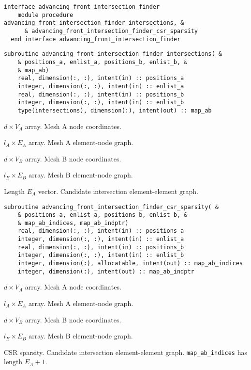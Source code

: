 \documentclass{article}
\begin{document}
\begin{lstlisting}[language=FORTRAN]
  interface advancing_front_intersection_finder
    module procedure advancing_front_intersection_finder_intersections, &
      & advancing_front_intersection_finder_csr_sparsity
  end interface advancing_front_intersection_finder
\end{lstlisting}

\begin{lstlisting}[language=FORTRAN]
  subroutine advancing_front_intersection_finder_intersections( &
    & positions_a, enlist_a, positions_b, enlist_b, &
    & map_ab)
    real, dimension(:, :), intent(in) :: positions_a
    integer, dimension(:, :), intent(in) :: enlist_a
    real, dimension(:, :), intent(in) :: positions_b
    integer, dimension(:, :), intent(in) :: enlist_b
    type(intersections), dimension(:), intent(out) :: map_ab
\end{lstlisting}

\begin{description}[font=\ttfamily\bfseries,leftmargin=2.2\parindent,labelindent=1.7\parindent,noitemsep]
  \item[positions\_a] $d \times V_A$ array. Mesh A node coordinates.
  \item[enlist\_a] $l_A \times E_A$ array. Mesh A element-node graph.
  \item[positions\_b] $d \times V_B$ array. Mesh B node coordinates.
  \item[enlist\_b] $l_B \times E_B$ array. Mesh B element-node graph.
  \item[map\_ab] Length $E_A$ vector. Candidate intersection element-element
    graph.
\end{description}

\begin{lstlisting}[language=FORTRAN]
  subroutine advancing_front_intersection_finder_csr_sparsity( &
    & positions_a, enlist_a, positions_b, enlist_b, &
    & map_ab_indices, map_ab_indptr)
    real, dimension(:, :), intent(in) :: positions_a
    integer, dimension(:, :), intent(in) :: enlist_a
    real, dimension(:, :), intent(in) :: positions_b
    integer, dimension(:, :), intent(in) :: enlist_b
    integer, dimension(:), allocatable, intent(out) :: map_ab_indices
    integer, dimension(:), intent(out) :: map_ab_indptr
\end{lstlisting}

\begin{description}[font=\ttfamily\bfseries,leftmargin=2.2\parindent,labelindent=1.7\parindent,noitemsep]
  \item[positions\_a] $d \times V_A$ array. Mesh A node coordinates.
  \item[enlist\_a] $l_A \times E_A$ array. Mesh A element-node graph.
  \item[positions\_b] $d \times V_B$ array. Mesh B node coordinates.
  \item[enlist\_b] $l_B \times E_B$ array. Mesh B element-node graph.
  \item[map\_ab\_indices, map\_ab\_indptr] CSR sparsity. Candidate intersection
    element-element graph. \linebreak \verb+map_ab_indices+ has length
    $E_A + 1$.
\end{description}
\end{document}
